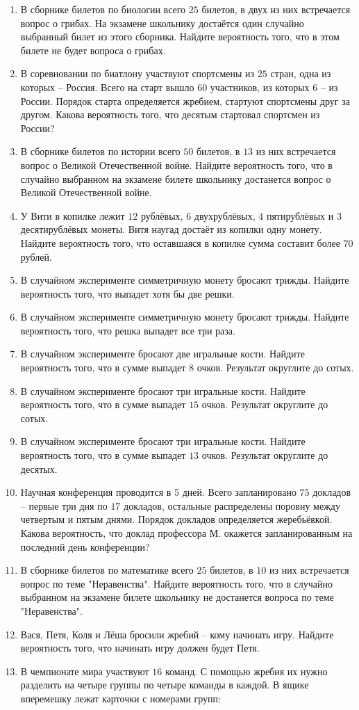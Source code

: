 \documentclass[12pt, a4paper]{article}
\begin{document}
\begin{enumerate}
		\item В сборнике билетов по биологии всего \( 25 \) билетов, в двух из них встречается вопрос о грибах. На экзамене школьнику достаётся один случайно выбранный билет из этого сборника. Найдите вероятность того, что в этом билете не будет вопроса о грибах.
		\item В соревновании по биатлону участвуют спортсмены из \(25\) стран, одна из которых – Россия. Всего на старт вышло \(60\) участников, из которых \(6\) – из России. Порядок старта определяется жребием, стартуют спортсмены друг за другом. Какова вероятность того, что десятым стартовал спортсмен из России?
		\item В сборнике билетов по истории всего \( 50 \) билетов, в \( 13 \) из них встречается вопрос о Великой Отечественной войне. Найдите вероятность того, что в случайно выбранном на экзамене билете школьнику достанется вопрос о Великой Отечественной войне.
		\item У Вити в копилке лежит \( 12 \) рублёвых, \( 6 \) двухрублёвых, \( 4 \) пятирублёвых и \( 3 \) десятирублёвых монеты. Витя наугад достаёт из копилки одну монету. Найдите вероятность того, что оставшаяся в копилке сумма составит более \( 70 \) рублей.
		\item В случайном эксперименте симметричную монету бросают трижды. Найдите вероятность того, что выпадет хотя бы две решки.
		\item В случайном эксперименте симметричную монету бросают трижды. Найдите вероятность того, что решка выпадет все три раза.
		\item В случайном эксперименте бросают две игральные кости. Найдите вероятность того, что в сумме выпадет \( 8 \) очков. Результат округлите до сотых.
		\item В случайном эксперименте бросают три игральные кости. Найдите вероятность того, что в сумме выпадет \( 15 \) очков. Результат округлите до сотых.
		\item В случайном эксперименте бросают три игральные кости. Найдите вероятность того, что в сумме выпадет \( 13 \) очков. Результат округлите до десятых.
		\item Научная конференция проводится в \( 5 \) дней. Всего запланировано \( 75 \) докладов – первые три дня по \( 17 \) докладов, остальные распределены поровну между четвертым и пятым днями. Порядок докладов определяется жеребьёвкой. Какова вероятность, что доклад профессора М. окажется запланированным на последний день конференции?
		\item В сборнике билетов по математике всего \( 25 \) билетов, в \( 10 \) из них встречается вопрос по теме "Неравенства". Найдите вероятность того, что в случайно выбранном на экзамене билете школьнику не достанется вопроса по теме "Неравенства".
		\item Вася, Петя, Коля и Лёша бросили жребий – кому начинать игру. Найдите вероятность того, что начинать игру должен будет Петя.
		\item В чемпионате мира участвуют \( 16 \) команд. С помощью жребия их нужно разделить на четыре группы по четыре команды в каждой. В ящике вперемешку лежат карточки с номерами групп:
		

\end{enumerate}
\end{document}
